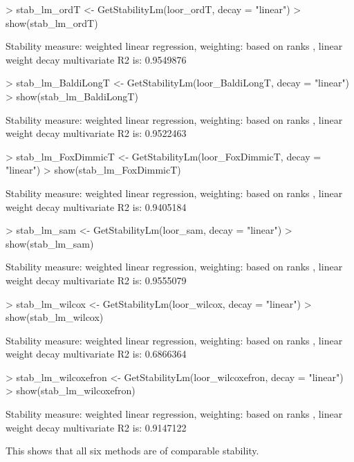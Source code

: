 \begin{Schunk}
\begin{Sinput}
> stab_lm_ordT <- GetStabilityLm(loor_ordT, decay = "linear")
> show(stab_lm_ordT)
\end{Sinput}
\begin{Soutput}
Stability measure: weighted linear regression, 
 weighting:  based on ranks ,  linear weight decay 
 multivariate R2 is:  0.9549876 
\end{Soutput}
\begin{Sinput}
> stab_lm_BaldiLongT <- GetStabilityLm(loor_BaldiLongT, decay = "linear")
> show(stab_lm_BaldiLongT)
\end{Sinput}
\begin{Soutput}
Stability measure: weighted linear regression, 
 weighting:  based on ranks ,  linear weight decay 
 multivariate R2 is:  0.9522463 
\end{Soutput}
\begin{Sinput}
> stab_lm_FoxDimmicT <- GetStabilityLm(loor_FoxDimmicT, decay = "linear")
> show(stab_lm_FoxDimmicT)
\end{Sinput}
\begin{Soutput}
Stability measure: weighted linear regression, 
 weighting:  based on ranks ,  linear weight decay 
 multivariate R2 is:  0.9405184 
\end{Soutput}
\begin{Sinput}
> stab_lm_sam <- GetStabilityLm(loor_sam, decay = "linear")
> show(stab_lm_sam)
\end{Sinput}
\begin{Soutput}
Stability measure: weighted linear regression, 
 weighting:  based on ranks ,  linear weight decay 
 multivariate R2 is:  0.9555079 
\end{Soutput}
\begin{Sinput}
> stab_lm_wilcox <- GetStabilityLm(loor_wilcox, decay = "linear")
> show(stab_lm_wilcox)
\end{Sinput}
\begin{Soutput}
Stability measure: weighted linear regression, 
 weighting:  based on ranks ,  linear weight decay 
 multivariate R2 is:  0.6866364 
\end{Soutput}
\begin{Sinput}
> stab_lm_wilcoxefron <- GetStabilityLm(loor_wilcoxefron, decay = "linear")
> show(stab_lm_wilcoxefron)
\end{Sinput}
\begin{Soutput}
Stability measure: weighted linear regression, 
 weighting:  based on ranks ,  linear weight decay 
 multivariate R2 is:  0.9147122 
\end{Soutput}
\end{Schunk}
This shows that all six methods are of comparable stability.


